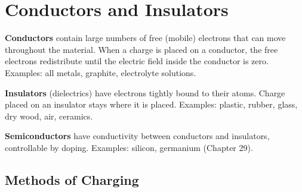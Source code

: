 \section{Conductors and Insulators}

\begin{defbox}
\textbf{Conductors} contain large numbers of free
(mobile) electrons that can move throughout the
material. When a charge is placed on a conductor, the
free electrons redistribute until the electric field
inside the conductor is zero. Examples: all metals,
graphite, electrolyte solutions.

\textbf{Insulators} (dielectrics) have electrons
tightly bound to their atoms. Charge placed on an
insulator stays where it is placed. Examples: plastic,
rubber, glass, dry wood, air, ceramics.

\textbf{Semiconductors} have conductivity between
conductors and insulators, controllable by doping.
Examples: silicon, germanium (Chapter 29).
\end{defbox}

\subsection{Methods of Charging}

